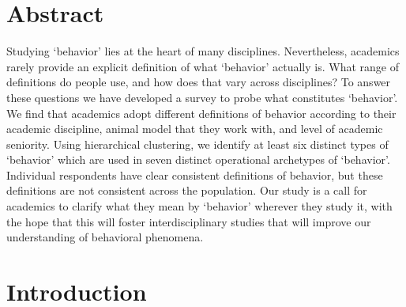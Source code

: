 \documentclass[a4paper, 11pt]{article}
\begin{document}

\vspace{6pt}

\vspace{6pt}



\vspace{18pt}

\section*{Abstract}

Studying `behavior' lies at the heart of many disciplines. Nevertheless, academics rarely provide an explicit definition of what `behavior' actually is. What range of definitions do people use, and how does that vary across disciplines? To answer these questions we have developed a survey to probe what constitutes `behavior'. We find that academics adopt different definitions of behavior according to their academic discipline, animal model that they work with, and level of academic seniority. Using hierarchical clustering, we identify at least six distinct types of `behavior' which are used in seven distinct operational archetypes of `behavior'. Individual respondents have clear consistent definitions of behavior, but these definitions are not consistent across the population. Our study is a call for academics to clarify what they mean by `behavior' wherever they study it, with the hope that this will foster interdisciplinary studies that will improve our understanding of behavioral phenomena.

\vspace{18pt}
\section*{Introduction}
\end{document}
